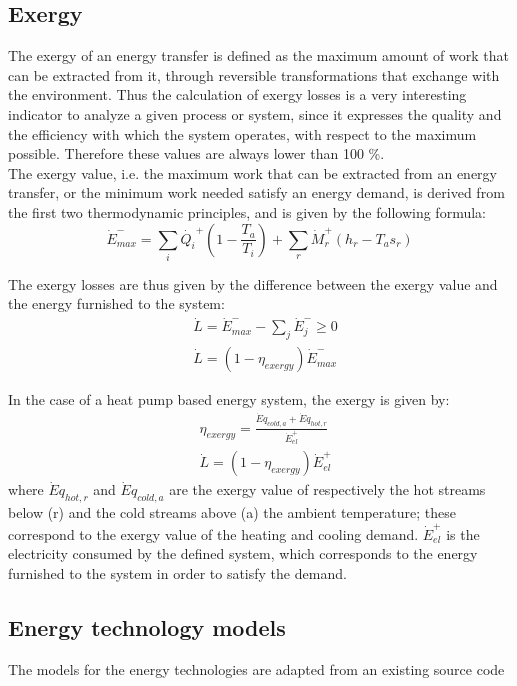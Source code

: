 \documentclass{article}
\begin{document}
\subsection{Exergy}\label{ss:exergy}
The exergy of an energy transfer is defined as the maximum amount of work that can be extracted from it, through reversible transformations that exchange with the environment. Thus the calculation of exergy losses is a very interesting indicator to analyze a given process or system, since it expresses the quality and the efficiency with which the system operates, with respect to the maximum possible. Therefore these values are always lower than 100 \%. \\

The exergy value, i.e. the maximum work that can be extracted from an energy transfer, or the minimum work needed satisfy an energy demand, is derived from the first two thermodynamic principles, and is given by the following formula:
\begin{equation}
    \dot{E}^{-}_{max} = \sum_{i} \dot{Q_i}^{+} (1 - \frac{T_{a}}{T_i} ) + \sum_{r} \dot{M}_{r}^{+} (h_{r} - T_{a} s_{r})    
\end{equation}

The exergy losses are thus given by the difference between the exergy value and the energy furnished to the system:
\begin{align}
	&    \dot{L} = \dot{E}^{-}_{max} - \sum_{j}\dot{E}^{-}_{j} \geq 0 \\
	& 	\dot{L} = (1-\eta_{exergy})\dot{E}^{-}_{max}
\end{align}

In the case of a heat pump based energy system, the exergy is given by:
\begin{align}
    & \eta_{exergy} =  \frac{\dot{E}q_{cold,a} + \dot{E}q_{hot,r}}{\dot{E}_{el}^{+}}  \\
    & \dot{L} = (1-\eta_{exergy})\dot{E}_{el}^{+}
\end{align}
where $\dot{E}q_{hot,r}$  and $\dot{E}q_{cold,a}$ are the exergy value of respectively the hot streams below (r) and the cold streams above (a) the ambient temperature; these correspond to the exergy value of the heating and cooling demand. $\dot{E}_{el}^{+}$ is the electricity consumed by the defined system, which corresponds to the energy furnished to the system in order to satisfy the demand.

\subsection{Energy technology models}\label{ss:et}
The models for the energy technologies are adapted from an existing source code~\cite{suciuEnergyautonomousCitiesUsing2016}
\end{document}
